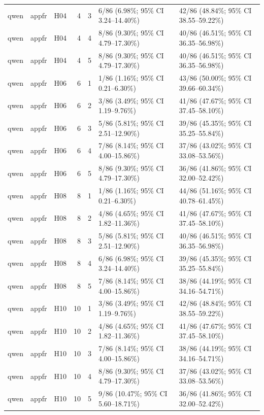 \begin{longtable}{lllrrll}
qwen & appfr & H04 & 4 & 3 & 6/86 (6.98\%; 95\% CI 3.24–14.40\%) & 42/86 (48.84\%; 95\% CI 38.55–59.22\%) \\
qwen & appfr & H04 & 4 & 4 & 8/86 (9.30\%; 95\% CI 4.79–17.30\%) & 40/86 (46.51\%; 95\% CI 36.35–56.98\%) \\
qwen & appfr & H04 & 4 & 5 & 8/86 (9.30\%; 95\% CI 4.79–17.30\%) & 40/86 (46.51\%; 95\% CI 36.35–56.98\%) \\
qwen & appfr & H06 & 6 & 1 & 1/86 (1.16\%; 95\% CI 0.21–6.30\%) & 43/86 (50.00\%; 95\% CI 39.66–60.34\%) \\
qwen & appfr & H06 & 6 & 2 & 3/86 (3.49\%; 95\% CI 1.19–9.76\%) & 41/86 (47.67\%; 95\% CI 37.45–58.10\%) \\
qwen & appfr & H06 & 6 & 3 & 5/86 (5.81\%; 95\% CI 2.51–12.90\%) & 39/86 (45.35\%; 95\% CI 35.25–55.84\%) \\
qwen & appfr & H06 & 6 & 4 & 7/86 (8.14\%; 95\% CI 4.00–15.86\%) & 37/86 (43.02\%; 95\% CI 33.08–53.56\%) \\
qwen & appfr & H06 & 6 & 5 & 8/86 (9.30\%; 95\% CI 4.79–17.30\%) & 36/86 (41.86\%; 95\% CI 32.00–52.42\%) \\
qwen & appfr & H08 & 8 & 1 & 1/86 (1.16\%; 95\% CI 0.21–6.30\%) & 44/86 (51.16\%; 95\% CI 40.78–61.45\%) \\
qwen & appfr & H08 & 8 & 2 & 4/86 (4.65\%; 95\% CI 1.82–11.36\%) & 41/86 (47.67\%; 95\% CI 37.45–58.10\%) \\
qwen & appfr & H08 & 8 & 3 & 5/86 (5.81\%; 95\% CI 2.51–12.90\%) & 40/86 (46.51\%; 95\% CI 36.35–56.98\%) \\
qwen & appfr & H08 & 8 & 4 & 6/86 (6.98\%; 95\% CI 3.24–14.40\%) & 39/86 (45.35\%; 95\% CI 35.25–55.84\%) \\
qwen & appfr & H08 & 8 & 5 & 7/86 (8.14\%; 95\% CI 4.00–15.86\%) & 38/86 (44.19\%; 95\% CI 34.16–54.71\%) \\
qwen & appfr & H10 & 10 & 1 & 3/86 (3.49\%; 95\% CI 1.19–9.76\%) & 42/86 (48.84\%; 95\% CI 38.55–59.22\%) \\
qwen & appfr & H10 & 10 & 2 & 4/86 (4.65\%; 95\% CI 1.82–11.36\%) & 41/86 (47.67\%; 95\% CI 37.45–58.10\%) \\
qwen & appfr & H10 & 10 & 3 & 7/86 (8.14\%; 95\% CI 4.00–15.86\%) & 38/86 (44.19\%; 95\% CI 34.16–54.71\%) \\
qwen & appfr & H10 & 10 & 4 & 8/86 (9.30\%; 95\% CI 4.79–17.30\%) & 37/86 (43.02\%; 95\% CI 33.08–53.56\%) \\
qwen & appfr & H10 & 10 & 5 & 9/86 (10.47\%; 95\% CI 5.60–18.71\%) & 36/86 (41.86\%; 95\% CI 32.00–52.42\%) \\

\end{longtable}
